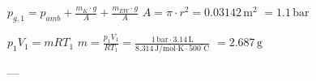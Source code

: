 \( p_{g,1} = p_{amb} + \frac{m_K \cdot g}{A} + \frac{m_{EW} \cdot g}{A} \)  
\( A = \pi \cdot r^2 = 0.03142 \, \text{m}^2 \)  
\( = 1.1 \, \text{bar} \)  

\( p_1 V_1 = m R T_1 \)  
\( m = \frac{p_1 V_1}{R T_1} = \frac{1 \, \text{bar} \cdot 3.14 \, \text{L}}{8.314 \, \text{J/mol·K} \cdot 500^\circ \text{C}} \)  
\( = 2.687 \, \text{g} \)  

---